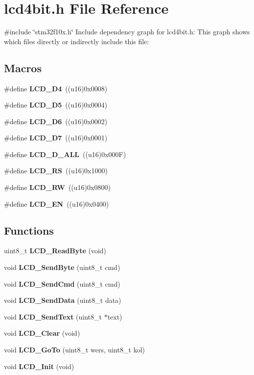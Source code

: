 \section{lcd4bit.\+h File Reference}
\label{lcd4bit_8h}
{\ttfamily \#include \char`\"{}stm32f10x.\+h\char`\"{}}\newline
Include dependency graph for lcd4bit.\+h\+:
This graph shows which files directly or indirectly include this file\+:
\subsection*{Macros}
\begin{DoxyCompactItemize}
\item 
\#define \textbf{ L\+C\+D\+\_\+\+D4}~((u16)0x0008)
\item 
\#define \textbf{ L\+C\+D\+\_\+\+D5}~((u16)0x0004)
\item 
\#define \textbf{ L\+C\+D\+\_\+\+D6}~((u16)0x0002)
\item 
\#define \textbf{ L\+C\+D\+\_\+\+D7}~((u16)0x0001)
\item 
\#define \textbf{ L\+C\+D\+\_\+\+D\+\_\+\+A\+LL}~((u16)0x000\+F)
\item 
\#define \textbf{ L\+C\+D\+\_\+\+RS}~((u16)0x1000)
\item 
\#define \textbf{ L\+C\+D\+\_\+\+RW}~((u16)0x0800)
\item 
\#define \textbf{ L\+C\+D\+\_\+\+EN}~((u16)0x0400)
\end{DoxyCompactItemize}
\subsection*{Functions}
\begin{DoxyCompactItemize}
\item 
uint8\+\_\+t \textbf{ L\+C\+D\+\_\+\+Read\+Byte} (void)
\item 
void \textbf{ L\+C\+D\+\_\+\+Send\+Byte} (uint8\+\_\+t cmd)
\item 
void \textbf{ L\+C\+D\+\_\+\+Send\+Cmd} (uint8\+\_\+t cmd)
\item 
void \textbf{ L\+C\+D\+\_\+\+Send\+Data} (uint8\+\_\+t data)
\item 
void \textbf{ L\+C\+D\+\_\+\+Send\+Text} (uint8\+\_\+t $\ast$text)
\item 
void \textbf{ L\+C\+D\+\_\+\+Clear} (void)
\item 
void \textbf{ L\+C\+D\+\_\+\+Go\+To} (uint8\+\_\+t wers, uint8\+\_\+t kol)
\item 
void \textbf{ L\+C\+D\+\_\+\+Init} (void)
\end{DoxyCompactItemize}



